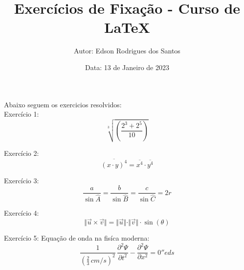 \documentclass[a4paper,12pt]{article}
\title{\textbf{Exercícios de Fixação - Curso de LaTeX}}
\author{Autor: Edson Rodrigues dos Santos}
\date{Data: 13 de Janeiro de 2023}
\begin{document}
\maketitle

Abaixo seguem os exercicios resolvidos:\\


Exercício 1:
\begin{equation}
\sqrt[3]{\left(\frac{2^3 + 2^5}{10}\right) }
\end{equation}

Exercício 2:
\begin{equation}
\overline{(x \cdot y)^4} = \overline{x^4} \cdot \overline{y^4}
\end{equation}

Exercício 3:
\begin{equation}
\frac{a}{\sin{\widehat{A}}} = \frac{b}{\sin{\widehat{B}}} = \frac{c}{\sin{\widehat{C}}} = 2r
\end{equation}

Exercício 4:
\begin{equation}
\Vert\vec{u} \times \vec{v}\Vert = \Vert\vec{u}\Vert \cdot  \Vert\vec{v}\Vert \cdot \sin(\theta)
\end{equation}

Exercício 5:
Equação de onda na fisíca moderna:
\begin{equation}
\frac{1}{\left(\frac{2}{3}\,cm/s\right)^{2}}\, \frac{\partial^{2}\Psi}{\partial t^{2}} - \frac{\partial^{2}\Psi}{\partial x^{2}} = 0

 ''eds 
\end{equation}
\end{document}
